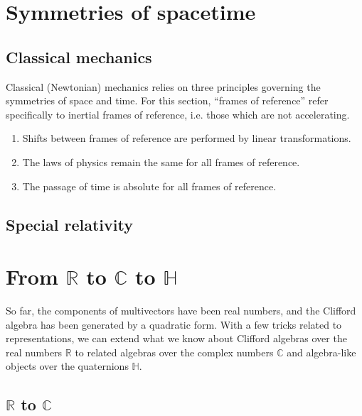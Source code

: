 \documentclass{article}
\begin{document}
\section{Symmetries of spacetime}
\subsection{Classical mechanics}
Classical (Newtonian) mechanics relies on three principles
governing the symmetries of space and time.
For this section, ``frames of reference'' refer specifically to inertial frames of reference,
i.e. those which are not accelerating.
\begin{enumerate}
\item Shifts between frames of reference are performed by linear transformations.
\item The laws of physics remain the same for all frames of reference.
\item The passage of time is absolute for all frames of reference.
\end{enumerate}
\subsection{Special relativity}

\section{From \texorpdfstring{$\mathbb{R}$}{R}
  to \texorpdfstring{$\mathbb{C}$}{C}
  to \texorpdfstring{$\mathbb{H}$}{H}}

So far, the components of multivectors have been real numbers,
and the Clifford algebra has been generated by a quadratic form.
With a few tricks related to representations, we can extend what we know
about Clifford algebras over the real numbers $\mathbb{R}$
to related algebras over the complex numbers $\mathbb{C}$
and algebra-like objects over the quaternions $\mathbb{H}$.

\subsection{\texorpdfstring{$\mathbb{R}$}{R} to \texorpdfstring{$\mathbb{C}$}{C}}
\end{document}
